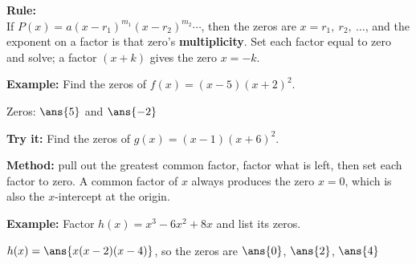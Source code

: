 \documentclass[12pt]{article}
\begin{document}


\begin{formulabox}
\textbf{Rule:}\\[3pt]
If $P(x) = a(x - r_1)^{m_1}(x - r_2)^{m_2}\cdots$, then the zeros are
$x = r_1,\ r_2,\ \ldots$, and the exponent on a factor is that zero's
\textbf{multiplicity}. Set each factor equal to zero and solve; a factor
$(x + k)$ gives the zero $x = -k$.
\end{formulabox}

\begin{examplebox}
\textbf{Example:} \quad Find the zeros of $f(x) = (x-5)(x+2)^2$.

Zeros: $\ans{5}$ and $\ans{-2}$
\end{examplebox}

\begin{tryitbox}
\textbf{Try it:} \quad Find the zeros of $g(x) = (x-1)(x+6)^2$.\\[2pt]
\end{tryitbox}


\begin{formulabox}
\textbf{Method:} pull out the greatest common factor, factor what is left, then
set each factor to zero. A common factor of $x$ always produces the zero $x = 0$,
which is also the $x$-intercept at the origin.
\end{formulabox}

\begin{examplebox}
\textbf{Example:} \quad Factor $h(x) = x^3 - 6x^2 + 8x$ and list its zeros.

$h(x) = \ans{x(x-2)(x-4)}$, \quad so the zeros are $\ans{0}$, $\ans{2}$, $\ans{4}$
\end{examplebox}
\end{document}
